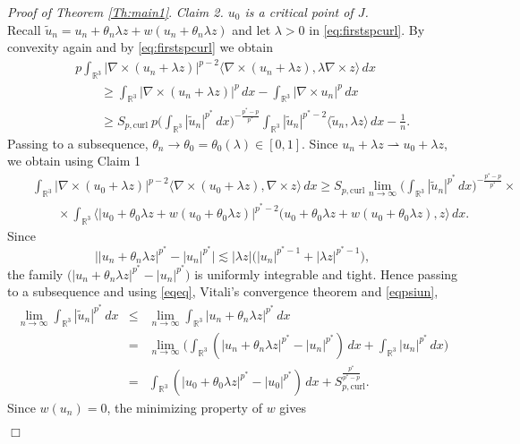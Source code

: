 \documentclass[12pt,leqno,twoside]{amsart}
\newenvironment{altproof}[1]
{\noindent%
{\em Proof of {#1}}.}
{\nopagebreak\mbox{}\hfill $\Box$\par\addvspace{0.5cm}}
\newcommand{\wt}{\widetilde}
\def\R{\mathbb{R}}
\def\curl{\mathrm{curl}}
\def\rh{\rightharpoonup}
\def\r{\mathbb{R}}
\def\r3{\mathbb{R}^3}
\def\rh{\rightharpoonup}
\def\ir3{\int_{\r3}}
\def\wt{\widetilde}
\def\curlop{\nabla\times}
\numberwithin{equation}{section}
\begin{document}
\begin{altproof}{Theorem \ref{Th:main1}}
{\em Claim 2. $u_0$ is a critical point of $J$.}\\
Recall $\wt u_n = u_n+\theta_n\lambda z+w(u_n+\theta_n\lambda z)$ and let $\lambda>0$ in \eqref{eq:firstspcurl}. By convexity again and by \eqref{eq:firstspcurl} we obtain
\begin{eqnarray*}
	&&p \int_{\R^3}|\curlop (u_n+\lambda z)|^{p-2}\langle \curlop (u_n+\lambda z),\lambda\curlop  z\rangle\,dx \\
	&& \qquad \geq \int_{\R^3}|\curlop (u_n+\lambda z)|^p\,dx-\int_{\R^3}|\curlop u_n|^p\,dx\\
	&&\qquad \geq S_{p,\curl} \ p\Big(\int_{\R^3}|\wt u_n|^{p^*}\,dx\Big)^{-\frac{p^*-p}{p^*}}\int_{\R^3}|\wt u_n|^{p^*-2}\langle \wt u_n, \lambda z\rangle \,dx-\frac{1}{n}.
\end{eqnarray*}
Passing to a subsequence, $\theta_n\to \theta_0=\theta_0(\lambda)\in [0,1]$. 
Since $u_n+\lambda z\rh u_0+\lambda z$, we obtain using Claim 1
\begin{eqnarray}
&&\int_{\R^3}|\curlop (u_0+\lambda z)|^{p-2}\langle \curlop (u_0+\lambda z), \curlop  z\rangle\,dx 
 \ge S_{p,\curl} \lim_{n\to\infty}\Big(\int_{\R^3}|\wt u_n|^{p^*}\,dx\Big)^{-\frac{p^*-p}{p^*}} \times \label{eq16} \\
&& \qquad \times \int_{\R^3}\langle |u_0+\theta_0\lambda z +w(u_0+\theta_0 \lambda z)|^{p^*-2}(u_0+\theta_0\lambda z +w(u_0+\theta_0 \lambda z), z\rangle \,dx. \nonumber
\end{eqnarray} 
Since
\begin{equation} \label{tight}
	\big||u_n+\theta_n\lambda z|^{p^*}-|u_n|^{p^*}\big| \lesssim  
	|\lambda z|\big(|u_n|^{p^*-1}+ |\lambda z|^{p^*-1}\big),
\end{equation}
the family $\big(|u_n+\theta_n\lambda z|^{p^*}-|u_n|^{p^*}\big)$  is uniformly integrable and tight.
Hence passing to a subsequence and using \eqref{eqeq}, Vitali's convergence theorem and  \eqref{eqpsiun},
\begin{eqnarray*}
 \lim_{n\to\infty}\int_{\R^3}|\wt u_n|^{p^*}\,dx &\leq& \lim_{n\to\infty}\int_{\R^3}|u_n+\theta_n\lambda z|^{p^*}\,dx \\ 
	&=& \lim_{n\to\infty} \Big(\ir3(|u_n+\theta_n\lambda z|^{p^*}-|u_n|^{p^*})\,dx +\ir3|u_n|^{p^*}\,dx \Big)  \\
	&=& \int_{\R^3}(|u_0+\theta_0\lambda z|^{p^*}-|u_0|^{p^*})\,dx + S_{p,\curl}^{\frac{p^*}{p^*-p}}.
\end{eqnarray*}
Since $w(u_n)=0$, the minimizing property of $w$ gives
\begin{eqnarray*}

\end{eqnarray*}
\end{altproof}
\end{document}
